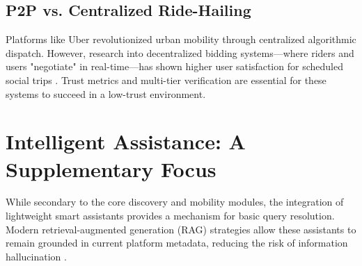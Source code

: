 \subsection{P2P vs. Centralized Ride-Hailing}
Platforms like Uber revolutionized urban mobility through centralized algorithmic dispatch. However, research into decentralized bidding systems—where riders and users "negotiate" in real-time—has shown higher user satisfaction for scheduled social trips \cite{peer2peer}. Trust metrics and multi-tier verification are essential for these systems to succeed in a low-trust environment.

\section{Intelligent Assistance: A Supplementary Focus}
While secondary to the core discovery and mobility modules, the integration of lightweight smart assistants provides a mechanism for basic query resolution. Modern retrieval-augmented generation (RAG) strategies allow these assistants to remain grounded in current platform metadata, reducing the risk of information hallucination \cite{llama3}.


